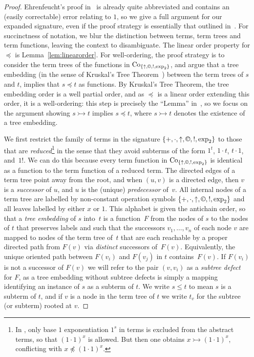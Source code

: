 \documentclass[eqnor,reqno]{amsart}
\theoremstyle{plain}
\theoremstyle{definition}
\newcommand{\cc}{\mathbin{\textup{\copyright}}}
\newcommand{\Co}{\operatorname{Co}}
\newcommand{\inj}{\rightarrowtail}
\begin{document}
\begin{proof}
Ehrenfeucht's proof in~\cite{ehr} is already quite abbreviated and contains an (easily correctable) error relating to $1$, so we give a full argument for our expanded signature, even if the proof strategy is essentially that outlined  in~\cite{ehr}.  
For succinctness of notation, we blur the distinction between terms, term trees and term functions, leaving the context to disambiguate.
The linear order property for $\preceq$ is Lemma~\ref{lem:linearorder}.  
For well-ordering, the proof strategy is to consider the term trees of the functions in $\Co_{\{\uparrow,\cc,!,\exp_2\}}$, and argue that a tree embedding (in the sense of Kruskal's Tree Theorem~\cite{kruskal}) between the term trees of $s$ and $t$, implies that $s\preceq t$ as functions.  
By Kruskal's Tree Theorem, the tree embedding order is a well partial order, and as $\preceq$ is a linear order extending this order, it is a well-ordering: this step is precisely the ``Lemma'' in~\cite{ehr}, so we focus on the argument showing $s\inj t$ implies $s\preceq t$, where $s\inj t$ denotes the existence of a tree embedding.

We first restrict the family of terms in the signature $\{+,\cdot,\uparrow,\cc,!,\exp_2\}$ to those that are \emph{reduced}\footnote{In \cite{ehr}, only base $1$ exponentiation $1^s$ in terms is excluded from the abstract terms, so that $(1\cdot 1)^x$ is allowed.  But then one obtains $x\inj (1\cdot 1)^x$, conflicting with $x\not\preceq (1\cdot 1)^x$.} in the sense that they avoid subterms of the form $1^t$, $1\cdot t$, $t\cdot 1$, and~$1!$.  
We can do this because every term function in $\Co_{\{\uparrow,\cc,!,\exp_2\}}$ is identical as a function to the term function of a reduced term.
The directed edges of a term tree point away from the root, and when $(u,v)$ is a directed edge, then $v$ is a \emph{successor} of  $u$, and $u$ is the (unique) \emph{predecessor} of~$v$.   
All internal nodes of a term tree are labelled by non-constant operation symbols $\{+,\cdot,\uparrow,\cc,!,\exp_2\}$ and all leaves labelled by either $x$ or $1$.  
This alphabet is given the antichain order, so that a \emph{tree embedding} of $s$ into~$t$ is a function~$F$ from the nodes of $s$ to the nodes of $t$ that preserves labels and such that the successors 
$v_1,\dots,v_n$ of each node $v$ are mapped to nodes of the term tree of~$t$ that are each reachable by a proper directed path from $F(v)$ via \emph{distinct} successors of~$F(v)$.  Equivalently, the unique oriented path between $F(v_i)$ and $F(v_j)$ in $t$ contains~$F(v)$.  
If $F(v_i)$ is not a successor of $F(v)$ we will refer to the pair $(v,v_i)$ as a \emph{subtree defect} for $F$, as a tree embedding without subtree defects is simply a mapping identifying an instance of $s$ as a subterm of $t$.  We write $s\leq t$ to mean $s$ is a subterm of $t$, and if $v$ is a node in the term tree of $t$ we write $t_v$ for the subtree (or subterm) rooted at $v$.



\end{proof}
\end{document}
